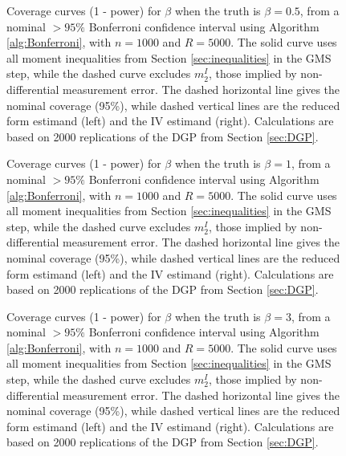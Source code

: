 \begin{figure}[h]
  \centering
  \caption{Coverage curves (1 - power) for $\beta$ when the truth is $\beta = 0.5$, from a nominal $>95\%$ Bonferroni confidence interval using Algorithm \ref{alg:Bonferroni}, with $n = 1000$ and $R = 5000$. The solid curve uses all moment inequalities from Section \ref{sec:inequalities} in the GMS step, while the dashed curve excludes $m_{2}^I$, those implied by non-differential measurement error. The dashed horizontal line gives the nominal coverage (95\%), while dashed vertical lines are the reduced form estimand (left) and the IV estimand (right). Calculations are based on 2000 replications of the DGP from Section \ref{sec:DGP}.}
  \label{fig:bonf_point5_1000}
\end{figure}

\begin{figure}[h]
  \centering
  \caption{Coverage curves (1 - power) for $\beta$ when the truth is $\beta = 1$, from a nominal $>95\%$ Bonferroni confidence interval using Algorithm \ref{alg:Bonferroni}, with $n = 1000$ and $R = 5000$. The solid curve uses all moment inequalities from Section \ref{sec:inequalities} in the GMS step, while the dashed curve excludes $m_{2}^I$, those implied by non-differential measurement error. The dashed horizontal line gives the nominal coverage (95\%), while dashed vertical lines are the reduced form estimand (left) and the IV estimand (right). Calculations are based on 2000 replications of the DGP from Section \ref{sec:DGP}.}
  \label{fig:bonf_1_1000}
\end{figure}

\begin{figure}[h]
  \centering
  \caption{Coverage curves (1 - power) for $\beta$ when the truth is $\beta = 3$, from a nominal $>95\%$ Bonferroni confidence interval using Algorithm \ref{alg:Bonferroni}, with $n = 1000$ and $R = 5000$. The solid curve uses all moment inequalities from Section \ref{sec:inequalities} in the GMS step, while the dashed curve excludes $m_{2}^I$, those implied by non-differential measurement error. The dashed horizontal line gives the nominal coverage (95\%), while dashed vertical lines are the reduced form estimand (left) and the IV estimand (right). Calculations are based on 2000 replications of the DGP from Section \ref{sec:DGP}.}
  \label{fig:bonf_3_1000}
\end{figure}

